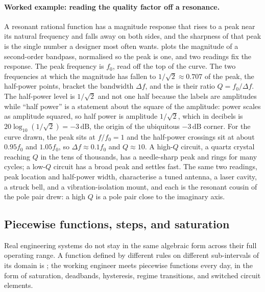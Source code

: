 

\paragraph{Worked example: reading the quality factor off a resonance.}
A resonant rational function has a magnitude response that rises to a
peak near its natural frequency and falls away on both sides, and the
sharpness of that peak is the single number a designer most often
wants.  plots the magnitude of a
second-order bandpass, normalised so the peak is one, and two readings
fix the response. The peak frequency is $f_0$, read off the top of the
curve. The two frequencies at which the magnitude has fallen to
$1/\sqrt{2} \approx 0.707$ of the peak, the half-power points, bracket
the bandwidth $\Delta f$, and the  is their
ratio $Q = f_0/\Delta f$. The half-power level is $1/\sqrt{2}$ and not
one half because the labels are amplitudes while ``half power'' is a
statement about the square of the amplitude: power scales as amplitude
squared, so half power is amplitude $1/\sqrt{2}$, which in decibels is
$20\log_{10}(1/\sqrt{2}) = -3\,\si{\deci\bel}$, the origin of the
ubiquitous $-3\,\si{\deci\bel}$ corner. For the curve drawn, the peak
sits at $f/f_0 = 1$ and the half-power crossings sit at about
$0.95 f_0$ and $1.05 f_0$, so $\Delta f \approx 0.1 f_0$ and $Q
\approx 10$. A high-$Q$ circuit, a quartz crystal reaching $Q$ in the
tens of thousands, has a needle-sharp peak and rings for many cycles;
a low-$Q$ circuit has a broad peak and settles fast. The same two
readings, peak location and half-power width, characterise a tuned
antenna, a laser cavity, a struck bell, and a vibration-isolation
mount, and each is the resonant cousin of the pole pair
 drew: a high $Q$ is a pole pair
close to the imaginary axis.



\subsection{Piecewise functions, steps, and saturation}

Real engineering systems do not stay in the same algebraic form
across their full operating range. A function defined by different
rules on different sub-intervals of its domain is ;
the working engineer meets piecewise functions every day, in the form
of saturation, deadbands, hysteresis, regime transitions, and
switched circuit elements.

